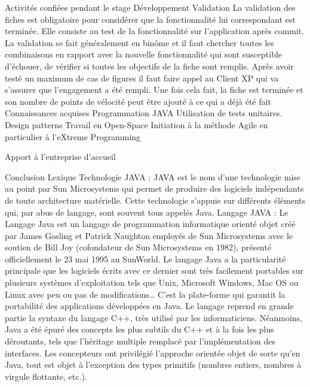 Activités confiées pendant le stage
Développement
Validation
La validation des fiches est obligatoire pour considérer que la fonctionnalité lui correspondant est terminée. Elle consiste au test de la fonctionnalité sur l'application après commit. La validation se fait généralement en binôme et il faut chercher toutes les combinaisons en rapport avec la nouvelle fonctionnalité qui sont susceptible d'échouer, de vérifier si toutes les objectifs de la fiche sont remplis. Après avoir testé un maximum de cas de figures il faut faire appel au Client XP qui va s'assurer que l'engagement a été rempli. Une fois cela fait, la fiche est terminée et son nombre de points de vélocité peut être ajouté à ce qui a déjà été fait
Connaissances acquises
Programmation JAVA
Utilisation de tests unitaires.
Design patterns
Travail en Open-Space
Initiation à la méthode Agile en particulier à l'eXtreme Programming


Apport à l'entreprise d'accueil


Conclusion
Lexique
Technologie JAVA : JAVA est le nom d’une technologie mise au point par Sun Microsystems qui permet de produire des logiciels indépendants de toute architecture matérielle. Cette technologie s’appuie sur différents éléments qui, par abus de langage, sont souvent tous appelés Java.
Langage JAVA : Le Langage Java est un langage de programmation informatique orienté objet créé par James Gosling et Patrick Naughton employés de Sun Microsystems avec le soutien de Bill Joy (cofondateur de Sun Microsystems en 1982), présenté officiellement le 23 mai 1995 au SunWorld. Le langage Java a la particularité principale que les logiciels écrits avec ce dernier sont très facilement portables sur plusieurs systèmes d’exploitation tels que Unix, Microsoft Windows, Mac OS ou Linux avec peu ou pas de modifications… C’est la plate-forme qui garantit la portabilité des applications développées en Java. Le langage reprend en grande partie la syntaxe du langage C++, très utilisé par les informaticiens. Néanmoins, Java a été épuré des concepts les plus subtils du C++ et à la fois les plus déroutants, tels que l’héritage multiple remplacé par l’implémentation des interfaces. Les concepteurs ont privilégié l’approche orientée objet de sorte qu’en Java, tout est objet à l’exception des types primitifs (nombres entiers, nombres à virgule flottante, etc.).

